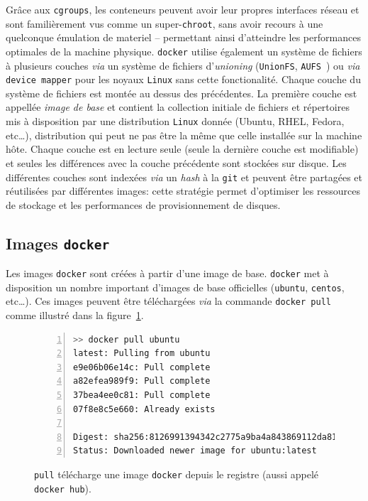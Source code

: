 \documentclass[a4paper]{article}
\begin{document}
Gr\^ace aux \texttt{cgroups}, les conteneurs peuvent avoir leur propres
interfaces r\'eseau et sont famili\`erement vus comme un super-\texttt{chroot},
sans avoir recours \`a une quelconque \'emulation de materiel -- permettant
ainsi d'atteindre les performances optimales de la machine physique.
\texttt{docker} utilise \'egalement un syst\`eme de fichiers \`a plusieurs
couches \emph{via} un syst\`eme de fichiers d'\emph{unioning}
(\texttt{UnionFS}\cite{ref-unionfs}, \texttt{AUFS}~\cite{ref-aufs}) ou
\emph{via} \texttt{device mapper} pour les noyaux \texttt{Linux} sans cette
fonctionalit\'e.
Chaque couche du syst\`eme de fichiers est mont\'ee au dessus des
pr\'ec\'edentes.
La premi\`ere couche est appell\'ee \emph{image de base} et contient la
collection initiale de fichiers et r\'epertoires mis \`a disposition par une
distribution \texttt{Linux} donn\'ee (Ubuntu, RHEL, Fedora, etc\ldots),
distribution qui peut ne pas \^etre la m\^eme que celle install\'ee sur la
machine h\^ote.
Chaque couche est en lecture seule (seule la derni\`ere couche est modifiable)
et seules les diff\'erences avec la couche pr\'ec\'edente sont stock\'ees sur
disque.
Les diff\'erentes couches sont index\'ees \emph{via} un \emph{hash} \`a la
\texttt{git} et peuvent \^etre partag\'ees et r\'eutilis\'ees par diff\'erentes
images: cette strat\'egie permet d'optimiser les ressources de stockage et les
performances de provisionnement de disques.

\subsection*{Images \texttt{docker}}

Les images \texttt{docker} sont cr\'e\'ees \`a partir d'une image de base.
\texttt{docker} met \`a disposition un nombre important d'images de base
officielles (\texttt{ubuntu}, \texttt{centos}, etc\ldots).
Ces images peuvent \^etre t\'el\'echarg\'ees \emph{via} la commande
\texttt{docker pull} comme illustr\'e dans la figure~\ref{fig-docker-pull}.

\begin{figure}[h]
\begin{lstlisting}[language=sh,
    basicstyle=\tiny,
    frame=trbl,
    numbers=left,
    showstringspaces=false,
    stringstyle=\ttfamily]
>> docker pull ubuntu
latest: Pulling from ubuntu
e9e06b06e14c: Pull complete 
a82efea989f9: Pull complete 
37bea4ee0c81: Pull complete 
07f8e8c5e660: Already exists 

Digest: sha256:8126991394342c2775a9ba4a843869112da8156037451fc424454db43c25d8b0
Status: Downloaded newer image for ubuntu:latest
\end{lstlisting}
\caption{\label{fig-docker-pull}\texttt{pull} t\'el\'echarge une image
	\texttt{docker} depuis le registre (aussi appel\'e \texttt{docker hub}).}
\end{figure}
\end{document}
